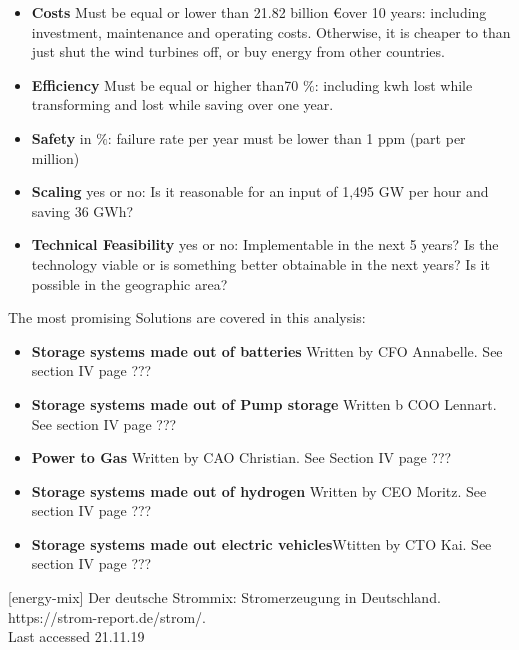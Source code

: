 \begin{parcolumns}[colwidths={1=2.5 cm, 2=10 cm, 3=2.5cm}]{3}
{\begin{itemize}
\item \textbf{Costs} Must be equal or lower than 21.82 billion \euro over 10 years: including investment, maintenance and operating costs. Otherwise, it is cheaper to than just shut the wind turbines off, or buy energy from other countries.
\item \textbf{Efficiency} Must be equal or higher than70 $\%$: including kwh lost while transforming and lost while saving over one year.
\item \textbf{Safety} in $\%$: failure rate per year must be lower than 1 ppm (part per million)
\item \textbf{Scaling} yes or no: Is it reasonable for an input of 1,495 GW per hour and saving 36 GWh? 
\item \textbf{Technical Feasibility} yes or no: Implementable in the next 5 years? Is the technology viable or is something better obtainable in the next years? Is it possible in the geographic area?  
\\
\end{itemize}
The most promising Solutions are covered in this analysis:
\begin{itemize}
\item \textbf{Storage systems made out of batteries} \newline Written by CFO Annabelle. See section IV page ???
\item \textbf{Storage systems made out of Pump storage} \newline Written b COO Lennart. See section IV page ???
\item \textbf{Power to Gas} \newline Written by CAO Christian. See Section IV page ???
\item \textbf{Storage systems made out of hydrogen} \newline Written by CEO Moritz. See section IV page ???
\item \textbf{Storage systems made out electric vehicles}\newline Wtitten by CTO Kai. See section IV page ???
\\
\end{itemize}
[energy-mix]  Der deutsche Strommix: Stromerzeugung in Deutschland. \\https://strom-report.de/strom/.\\Last accessed 21.11.19


}


\end{parcolumns}